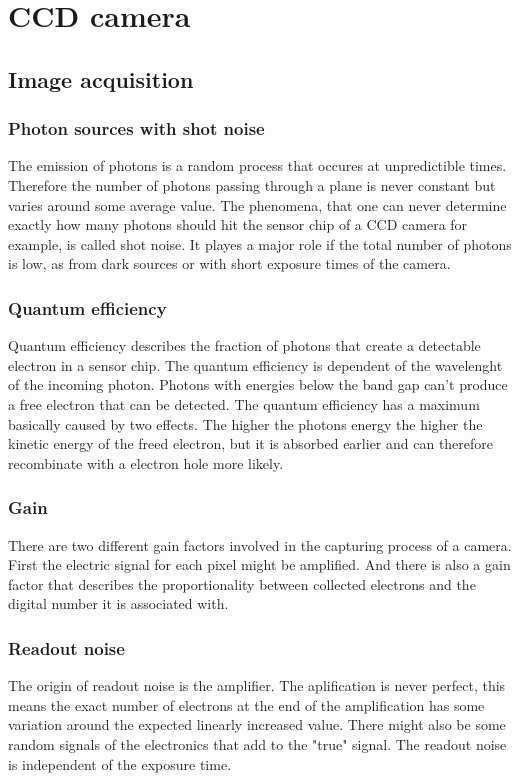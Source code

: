 \chapter{CCD camera}

\section{Image acquisition}
\subsection{Photon sources with shot noise}
The emission of photons is a random process that occures at unpredictible times. Therefore the number of photons passing through a plane is never constant but varies around some average value. The phenomena, that one can never determine exactly how many photons should hit the sensor chip of a CCD camera for example, is called shot noise. It playes a major role if the total number of photons is low, as from dark sources or with short exposure times of the camera.
\subsection{Quantum efficiency}
Quantum efficiency describes the fraction of photons that create a detectable electron in a sensor chip. The quantum efficiency is dependent of the wavelenght of the incoming photon. Photons with energies below the band gap can't produce a free electron that can be detected. The quantum efficiency has a maximum basically caused by two effects. The higher the photons energy the higher the kinetic energy of the freed electron, but it is absorbed earlier and can therefore recombinate with a electron hole more likely.
\subsection{Gain}
There are two different gain factors involved in the capturing process of a camera. First the electric signal for each pixel might be amplified. And there is also a gain factor that describes the proportionality between collected electrons and the digital number it is associated with.
\subsection{Readout noise}
The origin of readout noise is the amplifier. The aplification is never perfect, this means the exact number of electrons at the end of the amplification has some variation around the expected linearly increased value. There might also be some random signals of the electronics that add to the "true" signal. The readout noise is independent of the exposure time.
